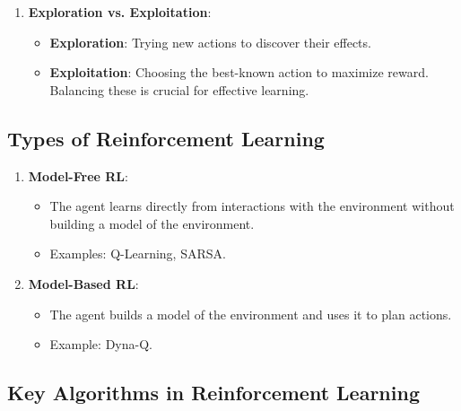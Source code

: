 \begin{enumerate}
    \item \textbf{Exploration vs. Exploitation}:
    \begin{itemize}
        \item \textbf{Exploration}: Trying new actions to discover their effects.
        \item \textbf{Exploitation}: Choosing the best-known action to maximize reward. Balancing these is crucial for effective learning.
    \end{itemize}
\end{enumerate}

\subsection*{Types of Reinforcement Learning}

\begin{enumerate}
    \item \textbf{Model-Free RL}:
    \begin{itemize}
        \item The agent learns directly from interactions with the environment without building a model of the environment.
        \item Examples: Q-Learning, SARSA.
    \end{itemize}

    \item \textbf{Model-Based RL}:
    \begin{itemize}
        \item The agent builds a model of the environment and uses it to plan actions.
        \item Example: Dyna-Q.
    \end{itemize}
\end{enumerate}

\subsection*{Key Algorithms in Reinforcement Learning}


